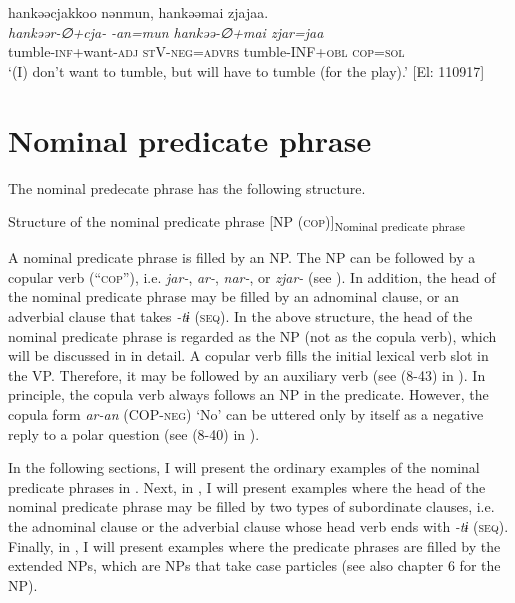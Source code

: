 \ex \label{ex:9.50b} %
    \glll  hankəəcjakkoo  nənmun,  hankəəmai  zjajaa.\\
      \textit{hankəər-∅+cja-}  \textit{-an=mun  hankəə-∅+mai  zjar=jaa}\\
      tumble-\textsc{inf}+want-\textsc{adj}  \textsc{st}V-\textsc{neg}=\textsc{advrs}  tumble-INF+\textsc{obl}  \textsc{cop}=\textsc{sol}\\
      \glt       ‘(I) don’t want to tumble, but will have to tumble (for the play).’ [El: 110917]
    \z
\z

\section{Nominal predicate phrase}\label{sec:9.3}

The nominal predecate phrase has the following structure.

\ea   Structure of the nominal predicate phrase \label{ex:9.51}
  [NP \hspace{\tabcolsep} (\textsc{cop})]\textsubscript{Nominal predicate phrase}
\z

A nominal predicate phrase is filled by an NP. The NP can be followed by a copular verb (“\textsc{cop}”), i.e. \textit{jar-}, \textit{ar-}, \textit{nar-}, or \textit{zjar-} (see ). In addition, the head of the nominal predicate phrase may be filled by an adnominal clause, or an adverbial clause that takes \textit{{}-tɨ} (\textsc{seq}). In the above structure, the head of the nominal predicate phrase is regarded as the NP (not as the copula verb), which will be discussed in  in detail. A copular verb fills the initial lexical verb slot in the VP. Therefore, it may be followed by an auxiliary verb (see (8-43) in ). In principle, the copula verb always follows an NP in the predicate. However, the copula form \textit{ar-an} (COP-\textsc{neg}) ‘No’ can be uttered only by itself as a negative reply to a polar question (see (8-40) in ).

In the following sections, I will present the ordinary examples of the nominal predicate phrases in . Next, in , I will present examples where the head of the nominal predicate phrase may be filled by two types of subordinate clauses, i.e. the adnominal clause or the adverbial clause whose head verb ends with \textit{{}-tɨ} (\textsc{seq}). Finally, in , I will present examples where the predicate phrases are filled by the extended NPs, which are NPs that take case particles (see also chapter 6 for the NP).

